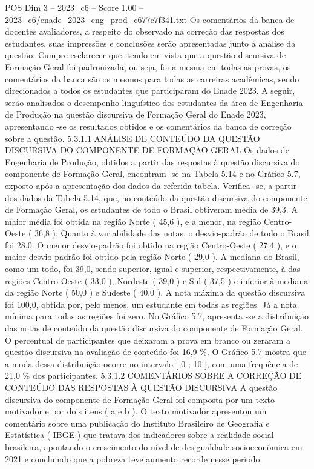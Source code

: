 \begin{textsample}{POS Dim 3 – 2023\_c6 – Score 1.00 – 2023\_c6/enade\_2023\_eng\_prod\_c677c7f341.txt}
Os comentários da banca de docentes avaliadores, a respeito do observado na correção das respostas dos estudantes, suas impressões e conclusões serão apresentadas junto à análise da questão.
Cumpre esclarecer que, tendo em vista que a questão discursiva de Formação Geral foi padronizada, ou seja, foi a mesma em todas as provas, os comentários da banca são os mesmos para todas as carreiras acadêmicas, sendo direcionados a todos os estudantes que participaram do Enade 2023.
A seguir, serão analisados o desempenho linguístico dos estudantes da área de Engenharia de Produção na questão discursiva de Formação Geral do Enade 2023, apresentando -se os resultados obtidos e os comentários da banca de correção sobre a questão. 5.3.1.1 ANÁLISE DE CONTEÚDO DA QUESTÃO DISCURSIVA DO COMPONENTE DE FORMAÇÃO GERAL Os dados de Engenharia de Produção, obtidos a partir das respostas à questão discursiva do componente de Formação Geral, encontram -se na Tabela 5.14 e no Gráfico 5.7, exposto após a apresentação dos dados da referida tabela.
Verifica -se, a partir dos dados da Tabela 5.14, que, no conteúdo da questão discursiva do componente de Formação Geral, os estudantes de todo o Brasil obtiveram média de 39,3.
A maior média foi obtida na região Norte ( 45,6 ), e a menor, na região Centro-Oeste ( 36,8 ).
Quanto à variabilidade das notas, o desvio-padrão de todo o Brasil foi 28,0.
O menor desvio-padrão foi obtido na região Centro-Oeste ( 27,4 ), e o maior desvio-padrão foi obtido pela região Norte ( 29,0 ).
A mediana do Brasil, como um todo, foi 39,0, sendo superior, igual e superior, respectivamente, à das regiões Centro-Oeste ( 33,0 ), Nordeste ( 39,0 ) e Sul ( 37,5 ) e inferior à mediana da região Norte ( 50,0 ) e Sudeste ( 40,0 ).
A nota máxima da questão discursiva foi 100,0, obtida por, pelo menos, um estudante em todas as regiões.
Já a nota mínima para todas as regiões foi zero.
No Gráfico 5.7, apresenta -se a distribuição das notas de conteúdo da questão discursiva do componente de Formação Geral.
O percentual de participantes que deixaram a prova em branco ou zeraram a questão discursiva na avaliação de conteúdo foi 16,9 \%.
O Gráfico 5.7 mostra que a moda dessa distribuição ocorre no intervalo [ 0 ; 10 ], com uma frequência de 21,0 \% dos participantes. 5.3.1.2 COMENTÁRIOS SOBRE A CORREÇÃO DE CONTEÚDO DAS RESPOSTAS À QUESTÃO DISCURSIVA A questão discursiva do componente de Formação Geral foi composta por um texto motivador e por dois itens ( a e b ).
O texto motivador apresentou um comentário sobre uma publicação do Instituto Brasileiro de Geografia e Estatística ( IBGE ) que tratava dos indicadores sobre a realidade social brasileira, apontando o crescimento do nível de desigualdade socioeconômica em 2021 e concluindo que a pobreza teve aumento recorde nesse período.

\end{textsample}
